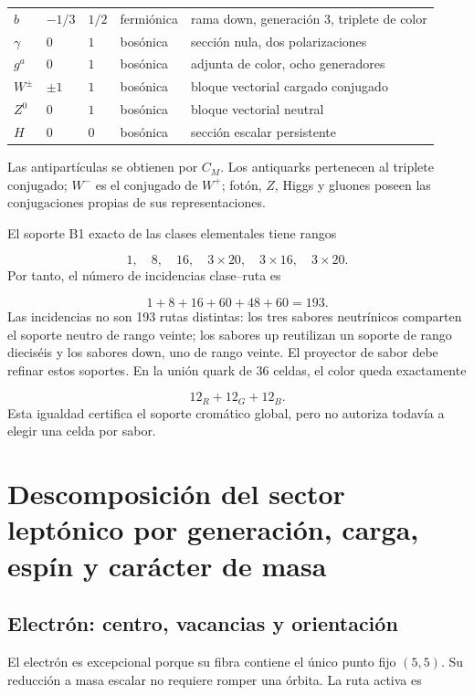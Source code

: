 \begin{longtable}{L{2.03cm}L{2.03cm}L{1.87cm}L{2.34cm}L{6.55cm}}
\(b\) & \(-1/\allowbreak{}3\) & \(1/\allowbreak{}2\) & fermiónica & rama down, generación 3, triplete de color \\
\(\gamma\) & \(0\) & \(1\) & bosónica & sección nula, dos polarizaciones \\
\(g^a\) & \(0\) & \(1\) & bosónica & adjunta de color, ocho generadores \\
\(W^\pm\) & \(\pm1\) & \(1\) & bosónica & bloque vectorial cargado conjugado \\
\(Z^0\) & \(0\) & \(1\) & bosónica & bloque vectorial neutral \\
\(H\) & \(0\) & \(0\) & bosónica & sección escalar persistente \\
\end{longtable}
\endgroup
Las antipartículas se obtienen por \(C_M\). Los antiquarks pertenecen al triplete conjugado; \(W^-\) es el conjugado de \(W^+\); fotón, \(Z\), Higgs y gluones poseen las conjugaciones propias de sus representaciones.

El soporte B1 exacto de las clases elementales tiene rangos

\[
 1,\quad8,\quad16,\quad
 3\times20,\quad
 3\times16,\quad
 3\times20.
\]
Por tanto, el número de incidencias clase--ruta es

\[
 1+8+16+60+48+60=193.
\]
Las incidencias no son 193 rutas distintas: los tres sabores neutrínicos comparten el soporte neutro de rango veinte; los sabores up reutilizan un soporte de rango dieciséis y los sabores down, uno de rango veinte. El proyector de sabor debe refinar estos soportes. En la unión quark de 36 celdas, el color queda exactamente

\[
 12_R+12_G+12_B.
\]
Esta igualdad certifica el soporte cromático global, pero no autoriza todavía a elegir una celda por sabor.

\section{Descomposición del sector leptónico por generación, carga, espín y carácter de masa}
\subsection{Electrón: centro, vacancias y orientación}
El electrón es excepcional porque su fibra contiene el único punto fijo \((5,5)\). Su reducción a masa escalar no requiere romper una órbita. La ruta activa es

